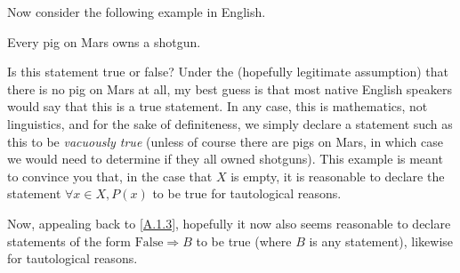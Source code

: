 Now consider the following example in English.
\begin{textequation}
Every pig on Mars owns a shotgun.
\end{textequation}
Is this statement true or false?  Under the (hopefully legitimate assumption) that there is no pig on Mars at all, my best guess is that most native English speakers would say that this is a true statement.  In any case, this is mathematics, not linguistics, and for the sake of definiteness, we simply declare a statement such as this to be \emph{vacuously true} (unless of course there are pigs on Mars, in which case we would need to determine if they all owned shotguns).  This example is meant to convince you that, in the case that $X$ is empty, it is reasonable to declare the statement $\forall x\in X,P(x)$ to be true for tautological reasons.

Now, appealing back to \eqref{A.1.3}, hopefully it now also seems reasonable to declare statements of the form $\text{False}\Rightarrow B$ to be true (where $B$ is any statement), likewise for tautological reasons.

